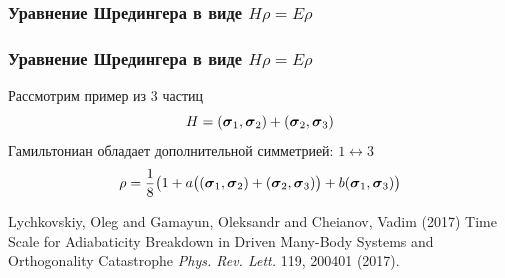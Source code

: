 \documentclass{beamer}
\begin{document}
\subsubsection{Уравнение Шредингера в виде $H\rho=E\rho$}
\begin{frame}
\frametitle{Уравнение Шредингера в виде $H\rho=E\rho$ \cite{hroero}}
Рассмотрим пример из 3 частиц
$$H=({\boldsymbol{\sigma}}_1,{\boldsymbol{\sigma}}_2)+({\boldsymbol{\sigma}}_2,{\boldsymbol{\sigma}}_3)$$
Гамильтониан обладает дополнительной симметрией: $1\leftrightarrow 3$
$$\rho = \frac18\big(1+a\big(({\boldsymbol{\sigma}}_1,{\boldsymbol{\sigma}}_2)+({\boldsymbol{\sigma}}_2,{\boldsymbol{\sigma}}_3)\big)+b({\boldsymbol{\sigma}}_1,{\boldsymbol{\sigma}}_3)\big)$$

\footnotesize{
\begin{thebibliography}{99}
 Lychkovskiy, Oleg and Gamayun, Oleksandr and Cheianov, Vadim (2017)
\newblock Time Scale for Adiabaticity Breakdown in Driven Many-Body Systems and Orthogonality Catastrophe
\newblock \emph{Phys. Rev. Lett.} 119, 200401 (2017).
\end{thebibliography}
}


\end{frame}
\end{document}
